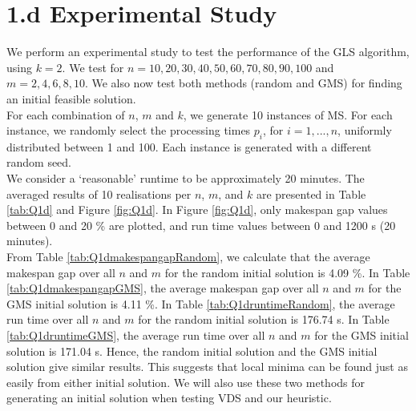 \documentclass[12pt,a4paper,reqno]{article}
\begin{document}
\section*{1.d Experimental Study}
We perform an experimental study to test the performance of the GLS algorithm, using $k=2$. We test for $n=10,20,30,40,50,60,70,80,90,100$ and $m=2,4,6,8,10$. We also now test both methods (random and GMS) for finding an initial feasible solution. \\

For each combination of $n$, $m$ and $k$, we generate 10 instances of MS. For each instance, we randomly select the processing times $p_i$, for $i=1,...,n$, uniformly distributed between 1 and 100. Each instance is generated with a different random seed. \\

We consider a `reasonable' runtime to be approximately 20 minutes. The averaged results of 10 realisations per $n$, $m$, and $k$ are presented in Table \ref{tab:Q1d} and Figure \ref{fig:Q1d}. In Figure \ref{fig:Q1d}, only makespan gap values between 0 and 20 \% are plotted, and run time values between 0 and 1200 s (20 minutes). \\

From Table \ref{tab:Q1dmakespangapRandom}, we calculate that the average makespan gap over all $n$ and $m$ for the random initial solution is 4.09 \%. In Table \ref{tab:Q1dmakespangapGMS}, the average makespan gap over all $n$ and $m$ for the GMS initial solution is 4.11 \%. In Table \ref{tab:Q1druntimeRandom}, the average run time over all $n$ and $m$ for the random initial solution is 176.74 s. In Table \ref{tab:Q1druntimeGMS}, the average run time over all $n$ and $m$ for the GMS initial solution is 171.04 s. Hence, the random initial solution and the GMS initial solution give similar results. This suggests that local minima can be found just as easily from either initial solution. We will also use these two methods for generating an initial solution when testing VDS and our heuristic.

\end{document}
